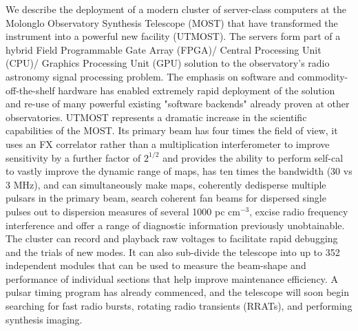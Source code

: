 We describe the deployment of a modern cluster of server-class computers at the Molonglo Observatory Synthesis Telescope (MOST) that have transformed the instrument into a powerful new facility (UTMOST). The servers form part of a hybrid Field Programmable Gate Array (FPGA)/ Central Processing Unit (CPU)/ Graphics Processing Unit (GPU) solution to the observatory's radio astronomy signal processing problem. The emphasis on software and commodity-off-the-shelf hardware has enabled extremely rapid deployment of the solution and re-use of many powerful existing "software backends" already proven at other observatories. 
UTMOST represents a dramatic increase in the scientific capabilities of the MOST. Its primary beam has four times the field of view, it uses an FX correlator rather than a multiplication interferometer to improve sensitivity by a further factor of $2^{1/2}$ and provides the ability to perform self-cal to vastly improve the dynamic range of maps, has ten times the bandwidth (30 vs 3 MHz), and can simultaneously make maps, coherently dedisperse multiple pulsars in the primary beam, search coherent fan beams for dispersed single pulses out to dispersion measures of several 1000 pc cm$^{-3}$, excise radio frequency interference and offer a range of diagnostic information previously unobtainable. The cluster can record and playback raw voltages to facilitate rapid debugging and the trials of new modes. It can also sub-divide the telescope into up to 352 independent modules that can be used to measure the beam-shape and performance of individual sections that help improve maintenance efficiency. A pulsar timing program has already commenced, and the telescope will soon begin searching for fast radio bursts, rotating radio transients (RRATs), and performing synthesis imaging. 
